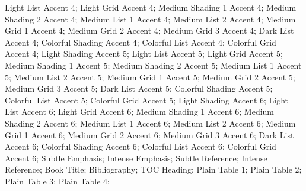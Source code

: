  Light List Accent 4;  Light Grid
Accent 4;   Medium Shading 1 Accent
4;  Medium Shading 2 Accent 4;
 Medium List 1 Accent 4;  Medium
List 2 Accent 4;   Medium Grid 1 Accent
4;  Medium Grid 2 Accent 4;
 Medium Grid 3 Accent 4;  Dark List
Accent 4;  Colorful Shading Accent 4;
  Colorful List Accent 4;
 Colorful Grid Accent 4;  Light
Shading Accent 5;  Light List Accent
5;  Light Grid Accent 5; 
 Medium Shading 1 Accent 5;  Medium
Shading 2 Accent 5;  Medium List 1 Accent
5;  Medium List 2 Accent 5; 
 Medium Grid 1 Accent 5;  Medium
Grid 2 Accent 5;  Medium Grid 3 Accent
5;  Dark List Accent 5;
 Colorful Shading Accent 5;  
Colorful List Accent 5;  Colorful Grid Accent
5;  Light Shading Accent 6;
 Light List Accent 6;  Light Grid
Accent 6;   Medium Shading 1 Accent
6;  Medium Shading 2 Accent 6;
 Medium List 1 Accent 6;  Medium
List 2 Accent 6;   Medium Grid 1 Accent
6;  Medium Grid 2 Accent 6;
 Medium Grid 3 Accent 6;  Dark List
Accent 6;  Colorful Shading Accent 6;
  Colorful List Accent 6;
 Colorful Grid Accent 6; 
 Subtle Emphasis;  
Intense Emphasis;    Subtle
Reference;   Intense
Reference;   Book
Title;   
Bibliography;   
  TOC Heading;  Plain
Table 1;  Plain Table 2;
 Plain Table 3;  Plain Table 4;
